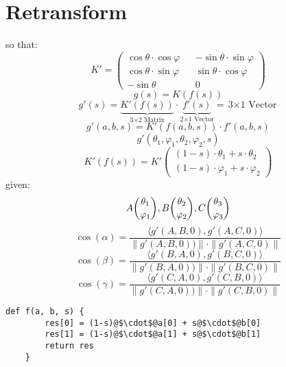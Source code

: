 \section{Retransform}
so that:
\begin{equation}
    K'=
    \begin{pmatrix}
       \cos\theta\cdot\cos\varphi && -\sin\theta\cdot\sin\varphi \\
       \cos\theta\cdot\sin\varphi && \sin\theta\cdot\cos\varphi \\
       -\sin\theta && 0
    \end{pmatrix}
\end{equation}
\begin{equation}
    g(s)=K(f(s))
\end{equation}
\begin{equation}
    g'(s) = \underbrace{K'(f(s))}_{\text{3$\times$2 Matrix}}\cdot\underbrace{f'(s)}_{\text{2$\times$1 Vector}}=\text{3$\times$1 Vector}
\end{equation}
\begin{equation}
    g'(a,b,s) = K'(f(a,b,s))\cdot f'(a,b,s)
\end{equation}
\begin{equation}
    g'(\theta_1,\varphi_1,\theta_2,\varphi_2,s)
\end{equation}
\begin{equation}
    K'(f(s))=K'
    \begin{pmatrix}
        (1-s)\cdot\theta_1 + s\cdot\theta_2 \\
        (1-s)\cdot\varphi_1 + s\cdot\varphi_2
    \end{pmatrix}
\end{equation}
given:
\begin{equation*}
    A\dbinom{\theta_1}{\varphi_1}, B\dbinom{\theta_2}{\varphi_2}, C\dbinom{\theta_3}{\varphi_3}
\end{equation*}
\begin{equation}
    \cos(\alpha)=\frac{\langle g'(A,B,0), g'(A,C,0)\rangle}{\|g'(A,B,0))\|\cdot \|g'(A,C,0)\|}
\end{equation}
\begin{equation}
    \cos(\beta)=\frac{\langle g'(B,A,0), g'(B,C,0)\rangle}{\|g'(B,A,0))\|\cdot \|g'(B,C,0)\|}
\end{equation}
\begin{equation}
    \cos(\gamma)=\frac{\langle g'(C,A,0), g'(C,B,0)\rangle}{\|g'(C,A,0))\|\cdot \|g'(C,B,0)\|}
\end{equation}
\begin{lstlisting}[escapechar=@]
    def f(a, b, s) {
        res[0] = (1-s)@$\cdot$@a[0] + s@$\cdot$@b[0]
        res[1] = (1-s)@$\cdot$@a[1] + s@$\cdot$@b[1]
        return res
    }
\end{lstlisting}
